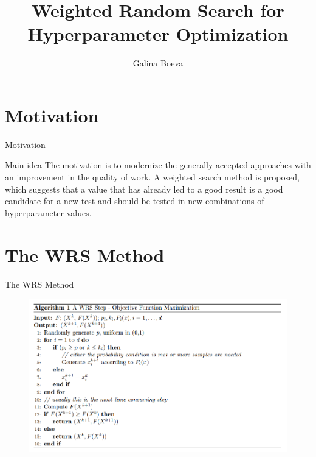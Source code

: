 \documentclass{beamer}
\title{Weighted Random Search for Hyperparameter Optimization
}
\author{Galina Boeva}
\institute{MIPT, 2023}
\begin{document}
\begin{frame}
    \titlepage
\end{frame}


\begin{frame}
    \tableofcontents
\end{frame}


\section{Motivation}
\begin{frame}{Motivation}
    \begin{block}{Main idea}
    The motivation is to modernize the generally accepted approaches with an improvement in the quality of work. A weighted search method is proposed, which suggests that a value that has already led to a good result is a good candidate for a new test and should be tested in new combinations of hyperparameter values.
    \end{block} 
\end{frame}


\section{The WRS Method}
\begin{frame}{The WRS Method}
\centering
\begin{figure}
        \centering
        \includegraphics[scale=0.7]{images/wrs.png}
        \label{fig:enter-label}
    \end{figure} 
\end{frame}
\end{document}
